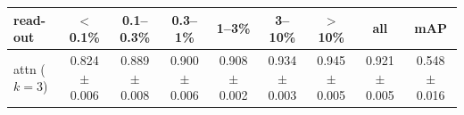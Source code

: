 \begin{tabular}{lcccccccc}
\toprule
read-out & $<$0.1\% & 0.1--0.3\% & 0.3--1\% & 1--3\% & 3--10\% & $>$10\% & all & mAP \\
\midrule
attn ($k=3$) & 0.824 $\pm$ 0.006 & 0.889 $\pm$ 0.008 & 0.900 $\pm$ 0.006 & 0.908 $\pm$ 0.002 & 0.934 $\pm$ 0.003 & 0.945 $\pm$ 0.005 & 0.921 $\pm$ 0.005 & 0.548 $\pm$ 0.016 \\
\bottomrule
\end{tabular}
